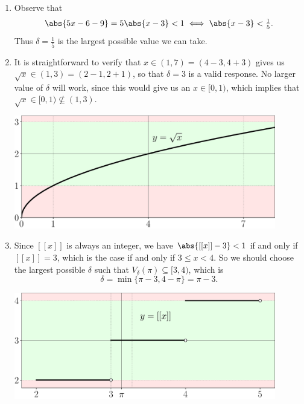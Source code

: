 \documentclass{lew98_solutions}
\begin{document}
\begin{solution}
    \begin{enumerate}
        \item Observe that
        \[
            \abs{5x - 6 - 9} = 5 \abs{x - 3} < 1 \iff \abs{x - 3} < \tfrac{1}{5}.
        \]
        Thus \( \delta = \tfrac{1}{5} \) is the largest possible value we can take.

        \item It is straightforward to verify that \( x \in (1, 7) = (4 - 3, 4 + 3) \) gives us \( \sqrt{x} \in (1, 3) = (2 - 1, 2 + 1) \), so that \( \delta = 3 \) is a valid response. No larger value of \( \delta \) will work, since this would give us an \( x \in [0, 1) \), which implies that \( \sqrt{x} \in [0, 1) \not\subseteq (1, 3) \).
        \begin{center}
            \includegraphics[width=0.9\textwidth]{UA_Figures/UA_ex4_2_2_fig_1.pdf}
        \end{center}

        \item Since \( [[x]] \) is always an integer, we have \( \abs{[[x]] - 3} < 1 \) if and only if \( [[x]] = 3 \), which is the case if and only if \( 3 \leq x < 4 \). So we should choose the largest possible \( \delta \) such that \( V_{\delta}(\pi) \subseteq [3, 4) \), which is
        \[
            \delta = \min \{ \pi - 3, 4 - \pi \} = \pi - 3.
        \]
        \begin{center}
            \includegraphics[width=0.9\textwidth]{UA_Figures/UA_ex4_2_2_fig_2.pdf}
        \end{center}


\end{enumerate}
\end{solution}
\end{document}

